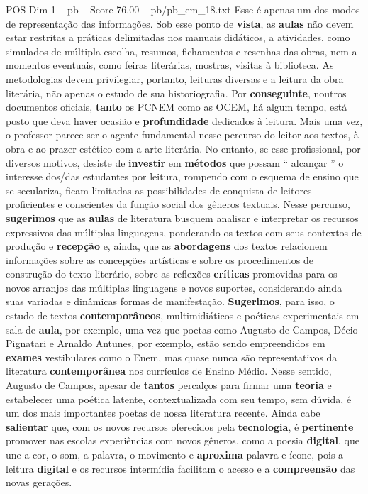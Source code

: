 \begin{textsample}{POS Dim 1 – pb – Score 76.00 – pb/pb\_em\_18.txt}
Esse é apenas um dos modos de representação das informações.
Sob esse ponto de \textbf{vista}, as \textbf{aulas} não devem estar restritas a práticas delimitadas nos manuais didáticos, a atividades, como simulados de múltipla escolha, resumos, fichamentos e resenhas das obras, nem a momentos eventuais, como feiras literárias, mostras, visitas à biblioteca.
As metodologias devem privilegiar, portanto, leituras diversas e a leitura da obra literária, não apenas o estudo de sua historiografia.
Por \textbf{conseguinte}, noutros documentos oficiais, \textbf{tanto} os PCNEM como as OCEM, há algum tempo, está posto que deva haver ocasião e \textbf{profundidade} dedicados à leitura.
Mais uma vez, o professor parece ser o agente fundamental nesse percurso do leitor aos textos, à obra e ao prazer estético com a arte literária.
No entanto, se esse profissional, por diversos motivos, desiste de \textbf{investir} em \textbf{métodos} que possam “ alcançar ” o interesse dos/das estudantes por leitura, rompendo com o esquema de ensino que se seculariza, ficam limitadas as possibilidades de conquista de leitores proficientes e conscientes da função social dos gêneros textuais.
Nesse percurso, \textbf{sugerimos} que as \textbf{aulas} de literatura busquem analisar e interpretar os recursos expressivos das múltiplas linguagens, ponderando os textos com seus contextos de produção e \textbf{recepção} e, ainda, que as \textbf{abordagens} dos textos relacionem informações sobre as concepções artísticas e sobre os procedimentos de construção do texto literário, sobre as reflexões \textbf{críticas} promovidas para os novos arranjos das múltiplas linguagens e novos suportes, considerando ainda suas variadas e dinâmicas formas de manifestação. \textbf{Sugerimos}, para isso, o estudo de textos \textbf{contemporâneos}, multimidiáticos e poéticas experimentais em sala de \textbf{aula}, por exemplo, uma vez que poetas como Augusto de Campos, Décio Pignatari e Arnaldo Antunes, por exemplo, estão sendo empreendidos em \textbf{exames} vestibulares como o Enem, mas quase nunca são representativos da literatura \textbf{contemporânea} nos currículos de Ensino Médio.
Nesse sentido, Augusto de Campos, apesar de \textbf{tantos} percalços para firmar uma \textbf{teoria} e estabelecer uma poética latente, contextualizada com seu tempo, sem dúvida, é um dos mais importantes poetas de nossa literatura recente.
Ainda cabe \textbf{salientar} que, com os novos recursos oferecidos pela \textbf{tecnologia}, é \textbf{pertinente} promover nas escolas experiências com novos gêneros, como a poesia \textbf{digital}, que une a cor, o som, a palavra, o movimento e \textbf{aproxima} palavra e ícone, pois a leitura \textbf{digital} e os recursos intermídia facilitam o acesso e a \textbf{compreensão} das novas gerações.

\end{textsample}
